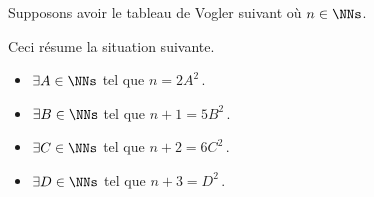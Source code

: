 

\newpage
\begin{example}
	Supposons avoir le tableau de Vogler suivant où $n \in \NNs$.

	\begin{center}
	\end{center}
	
	Ceci résume la situation suivante. 
	
	\begin{itemize}
		\item $\exists A \in \NNs$ tel que $n     = 2 A^2$\,.

		\item $\exists B \in \NNs$ tel que $n + 1 = 5 B^2$\,.

		\item $\exists C \in \NNs$ tel que $n + 2 = 6 C^2$\,.

		\item $\exists D \in \NNs$ tel que $n + 3 = D^2  $\,.
	\end{itemize}
\end{example}




